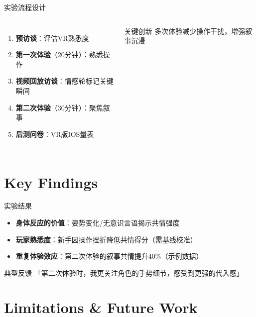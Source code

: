 \documentclass[aspectratio=169,xcolor=dvipsnames]{beamer}
\begin{document}

\begin{frame}{实验流程设计}
    \begin{columns}[c]
        \begin{enumerate}
            \item \textbf{预访谈}：评估VR熟悉度
            \item \textbf{第一次体验}（20分钟）：熟悉操作
            \item \textbf{视频回放访谈}：情感轮标记关键瞬间
            \item \textbf{第二次体验}（30分钟）：聚焦叙事
            \item \textbf{后测问卷}：VR版IOS量表
        \end{enumerate}
        
        \begin{alertblock}{关键创新}
            多次体验减少操作干扰，增强叙事沉浸
        \end{alertblock}
    \end{columns}
\end{frame}

\section{Key Findings}

\begin{frame}{实验结果}
    \begin{itemize}
        \item \textbf{身体反应的价值}：姿势变化/无意识言语揭示共情强度
        \item \textbf{玩家熟悉度}：新手因操作挫折降低共情得分（需基线校准）
        \item \textbf{重复体验效应}：第二次体验的叙事共情提升40\%（示例数据）
    \end{itemize}
    
    \begin{exampleblock}{典型反馈}
        「第二次体验时，我更关注角色的手势细节，感受到更强的代入感」
    \end{exampleblock}
\end{frame}

\section{Limitations \& Future Work}
\end{document}
